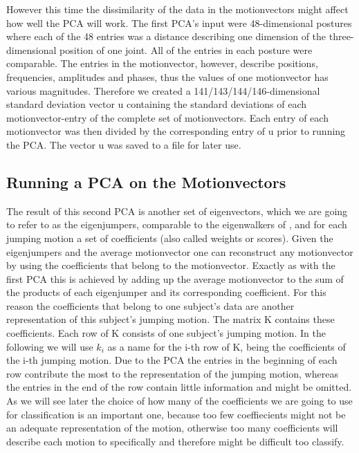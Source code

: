\documentclass[a4paper]{article}
\begin{document}
However this time the dissimilarity of the data in the motionvectors might affect how well the PCA will work.
The first PCA's input were 48-dimensional postures where each of the 48 entries was a distance describing one dimension of the three-dimensional position of one joint.
All of the entries in each posture were comparable.
The entries in the motionvector, however, describe positions, frequencies, amplitudes and phases, thus the values of one motionvector has various magnitudes.
Therefore we created a 141/143/144/146-dimensional standard deviation vector u containing the standard deviations of each motionvector-entry of the complete set of motionvectors.
Each entry of each motionvector was then divided by the corresponding entry of u prior to running the PCA.
The vector u was saved to a file for later use.

\subsection{Running a PCA on the Motionvectors}

The result of this second PCA is another set of eigenvectors, which we are going to refer to as the eigenjumpers, comparable to the eigenwalkers of \cite{origin}, and for each jumping motion a set of coefficients (also called weights or scores).
Given the eigenjumpers and the average motionvector one can reconstruct any motionvector by using the coefficients that belong to the motionvector. Exactly as with the first PCA this is achieved by adding up the average motionvector to the sum of the products of each eigenjumper and its corresponding coefficient.
For this reason the coefficients that belong to one subject's data are another representation of this subject's jumping motion.
The matrix K contains these coefficients. Each row of K consists of one subject's jumping motion. In the following we will use $k_{i}$ as a name for the i-th row of K, being the coefficients of the i-th jumping motion.
Due to the PCA the entries in the beginning of each row contribute the most to the representation of the jumping motion, whereas the entries in the end of the row contain little information and might be omitted. As we will see later the choice of how many of the coefficients we are going to use for classification is an important one, because too few coeffiecients might not be an adequate representation of the motion, otherwise too many coefficients will describe each motion to specifically and therefore might be difficult too classify.
\end{document}
